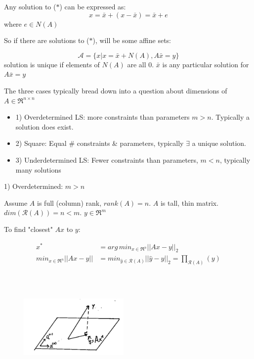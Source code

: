 Any solution to ($*$) can be expressed as:
\begin{equation*}
x = \bar{x} + (x - \bar{x}) = \bar{x} + e
\end{equation*}
where $e\in N(A)$

So if there are solutions to ($*$), will be some affine sets:

\begin{equation*}
\mathcal{A} = \{x|x = \bar{x} + N(A), A\bar{x} = y \}
\end{equation*}
solution is unique if elements of $N(A)$ are all 0. $\bar{x}$ is any particular solution for $A\bar{x} =y$

The three cases typically bread down into a question about dimensions of $A\in \Re^{n\times n}$

\begin{itemize}
	\item 1) Overdetermined LS: more constraints than parameters $m>n$. Typically a solution does exist. 
	
	\item 2) Square: Equal \# constraints \& parameters, typically $\exists$  a unique solution.
	
	\item 3) Underdetermined LS: Fewer constraints than parameters, $m<n$, typically many solutions
\end{itemize}

1) Overdetermined: $m > n$

Assume $A$ is full (column) rank, $rank(A) =n$. $A$ is tall, thin matrix. $dim(\mathcal{R}(A)) = n < m$. $y\in \Re^m$

To find "closest" $Ax$ to $y$:

\begin{align*}
x^* &= arg \, min_{x\in \Re^n}||Ax - y||_2\\
min_{x\in \Re^{n}}||Ax - y|| &= min_{\hat{y}\in \mathcal{R}(A)}||\hat{y} - y||_2 =\prod_{\mathcal{R}(A)}(y)\\
\end{align*}

\begin{figure}
	\centering
	\includegraphics[width=2.1in,height=2.1in]{figures/ch06/figure1.png}
\end{figure}



